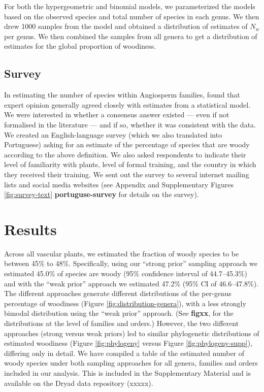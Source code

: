 \documentclass[a4paper,12pt]{article}
\begin{document}
For both the hypergeometric and binomial models, we parameterized the models
based on the observed species and total number of species in each genus. 
We then drew 1000 samples from the model and obtained a distribution of 
estimates of $N_w$ per genus. We then combined the samples from all genera to 
get a distribution of estimates for the global proportion of woodiness.

\subsection{Survey}

%
In estimating the number of species within Angiosperm families,
\citet{joppa2010} found that expert opinion generally agreed closely
with estimates from a statistical model.  We were interested in
whether a consensus answer existed --- even if not formalised in the
literature --- and if so, whether it was consistent with the data.
% 
We created an English-language survey (which we also translated into
Portuguese) asking for an estimate of the percentage of species that
are woody according to the above definition.  We also asked
respondents to indicate their level of familiarity with plants, level
of formal training, and the country in which they received their
training. We sent out the survey to several internet mailing lists and
social media websites (see Appendix and Supplementary Figures
\ref{fig:survey-text} \textbf{portuguse-survey} for details on the survey).

\section{Results}

Across all vascular plants, we estimated the fraction of woody species
to be between 45\% to 48\%.
Specifically, using our ``strong prior'' sampling approach we
estimated 45.0\% of species are woody (95\% confidence interval of
44.7--45.3\%) and with the ``weak prior'' approach we estimated 47.2\%
(95\% CI of 46.6--47.8\%).
The different approaches generate different distributions of the
per-genus percentage of woodiness (Figure
\ref{fig:distribution-genera}), with a less strongly bimodal
distribution using the ``weak prior'' approach. (See \textbf{figxx}, 
for the distributions at the level of families and orders.) 
However, the two different approaches (strong
versus weak priors) led to similar phylogenetic distributions of
estimated woodiness (Figure \ref{fig:phylogeny} versus Figure
\ref{fig:phylogeny-supp}), differing only in detail. We have compiled
a table of the estimated number of woody species under both sampling
approaches for all genera, families and orders included in our analysis.
This is included in the Supplementary Material and is available on the 
Dryad data repository (xxxxx).
\end{document}
